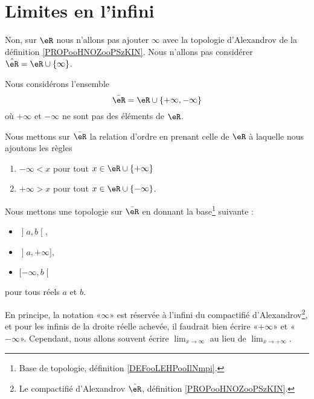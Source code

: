 \section{Limites en l'infini}

Non, sur \( \eR\) nous n'allons pas ajouter \( \infty\) avec la topologie d'Alexandrov de la définition \ref{PROPooHNOZooPSzKIN}. Nous n'allons pas considérer \( \hat \eR=\eR\cup\{ \infty \}\).

\begin{definition}        \label{DEFooRUyiBSUooALDDOa}
	Nous considérons l'ensemble
	\begin{equation}
		\bar \eR=\eR\cup\{ +\infty,-\infty \}
	\end{equation}
	où \( +\infty\) et \( -\infty\) ne sont pas des éléments de \( \eR\).

	Nous mettons sur \( \bar\eR\) la relation d'ordre en prenant celle de \( \eR\) à laquelle nous ajoutons les règles
	\begin{enumerate}
		\item
		      \( -\infty<x\) pour tout \( x\in\eR\cup\{ +\infty \}\)
		\item
		      \( +\infty>x\) pour tout \( x\in \eR\cup\{ -\infty \}\).
	\end{enumerate}

	Nous mettons une topologie sur \( \bar\eR\) en donnant la base\footnote{Base de topologie, définition \ref{DEFooLEHPooIlNmpi}.} suivante :
	\begin{itemize}
		\item \( \mathopen] a , b \mathclose[\),
		\item \( \mathopen] a , +\infty \mathclose]\),
		\item \( \mathopen[ -\infty , b \mathclose[\)
	\end{itemize}
	pour tous réels \( a\) et \( b\).
\end{definition}

\begin{normaltext}
	En principe, la notation «\( \infty\)» est réservée à l'infini du compactifié d'Alexandrov\footnote{Le compactifié d'Alexandrov \( \hat \eR\), définition \ref{PROPooHNOZooPSzKIN}.}, et pour les infinis de la droite réelle achevée, il faudrait bien écrire «\( +\infty\)» et «\( -\infty\)». Cependant, nous allons souvent écrire \( \lim_{x\to \infty} \) au lieu de \( \lim_{x\to +\infty} \).
\end{normaltext}

